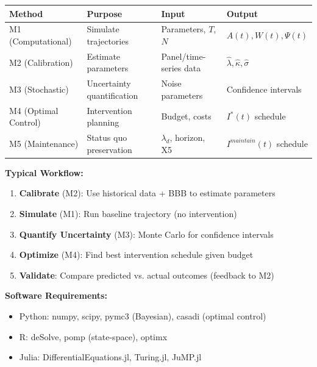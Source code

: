 \begin{tcolorbox}[colback=yellow!5!white, colframe=yellow!75!black,
    title=\textbf{UNTCM Methodology: Quick Reference}]

\begin{center}
\renewcommand{\arraystretch}{1.3}
\begin{tabular}{@{}llll@{}}
\toprule
\textbf{Method} & \textbf{Purpose} & \textbf{Input} & \textbf{Output} \\
\midrule
M1 (Computational) & Simulate trajectories & Parameters, $T$, $N$ & $A(t), W(t), \Psi(t)$ \\
M2 (Calibration) & Estimate parameters & Panel/time-series data & $\hat{\lambda}, \hat{\kappa}, \hat{\sigma}$ \\
M3 (Stochastic) & Uncertainty quantification & Noise parameters & Confidence intervals \\
M4 (Optimal Control) & Intervention planning & Budget, costs & $I^*(t)$ schedule \\
M5 (Maintenance) & Status quo preservation & $\lambda_d$, horizon, X5 & $I^{maintain}(t)$ schedule \\
\bottomrule
\end{tabular}
\end{center}

\textbf{Typical Workflow:}
\begin{enumerate}[nosep]
\item \textbf{Calibrate} (M2): Use historical data + BBB to estimate parameters
\item \textbf{Simulate} (M1): Run baseline trajectory (no intervention)
\item \textbf{Quantify Uncertainty} (M3): Monte Carlo for confidence intervals
\item \textbf{Optimize} (M4): Find best intervention schedule given budget
\item \textbf{Validate}: Compare predicted vs. actual outcomes (feedback to M2)
\end{enumerate}

\textbf{Software Requirements:}
\begin{itemize}[nosep]
\item Python: numpy, scipy, pymc3 (Bayesian), casadi (optimal control)
\item R: deSolve, pomp (state-space), optimx
\item Julia: DifferentialEquations.jl, Turing.jl, JuMP.jl
\end{itemize}

\end{tcolorbox}

